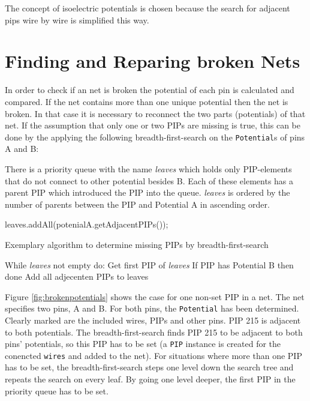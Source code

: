 The concept of isoelectric potentials is chosen because the search for adjacent pips wire by wire is simplified this way.



\section{Finding and Reparing broken Nets}
\label{sec:findingandrepairingbrokennets}

In order to check if an net is broken the potential of each pin is calculated and compared. If the net contains more than one unique potential then the net is broken.
In that case it is necessary to reconnect the two parts (potentials) of that net. If the assumption that only one or two PIPs are missing is true, this can be done by the applying the following breadth-first-search on the \texttt{Potential}s of pins A and B:

There is a priority queue with the name \textit{leaves} which holds only PIP-elements that do not connect to other potential besides B. 
Each of these elements has a parent PIP which introduced the PIP into the queue. \textit{leaves} is ordered by the number of parents between the PIP and Potential A in ascending order.

\begin{algorithm}[h]
	leaves.addAll(potenialA.getAdjacentPIPs());\\
 \caption{Exemplary algorithm to determine missing PIPs by breadth-first-search}
 \label{alg:breadth-first-search}
\end{algorithm}


While \textit{leaves} not empty do:
	Get first PIP of \textit{leaves}
	If PIP has Potential B then done
	Add all adjecenten PIPs to leaves

Figure \ref{fig:brokenpotentials} shows the case for one non-set PIP in a net. The net specifies two pins, A and B. For both pins, the \texttt{Potential} has been determined. Clearly marked are the included wires, PIPs and other pins. PIP 215 is adjacent to both potentials. The breadth-first-search finds PIP 215 to be adjacent to both pins' potentials, so this PIP has to be set (a \texttt{PIP} instance is created for the conencted \texttt{wires} and added to the net). For situations where more than one PIP has to be set, the breadth-first-search steps one level down the search tree and repeats the search on every leaf. By going one level deeper, the first PIP in the priority queue has to be set.

